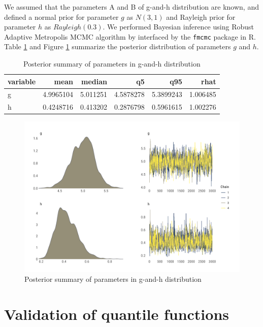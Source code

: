 \documentclass[
  12pt,
]{article}
\begin{document}
We assumed that the parameters A and B of g-and-h distribution are known, and defined a normal prior for parameter \(g\) as \(N(3,1)\) and Rayleigh prior for parameter \(h\) as \(Rayleigh(0.3)\). We performed Bayesian inference using Robust Adaptive Metropolis MCMC algorithm by \citet{vihola2012RobustAdaptiveMetropolis} interfaced by the \texttt{fmcmc} package \citep{vegayon2019FmcmcFriendlyMCMC} in R. Table \ref{tab:gnh-fit-tbl} and Figure \ref{fig:gnh-combo-graph} summarize the posterior distribution of parameters \(g\) and \(h\).

\begin{table}[!h]

\caption{\label{tab:gnh-fit-tbl}Posterior summary of parameters in g-and-h distribution}
\centering
\begin{tabular}[t]{lrrrrr}
\toprule
variable & mean & median & q5 & q95 & rhat\\
\midrule
g & 4.9965104 & 5.011251 & 4.5878278 & 5.3899243 & 1.006485\\
h & 0.4248716 & 0.413202 & 0.2876798 & 0.5961615 & 1.002276\\
\bottomrule
\end{tabular}
\end{table}

\begin{figure}

{\centering \includegraphics[width=0.8\linewidth]{ilbm_article_files/figure-latex/gnh-combo-graph-1} 

}

\caption{Posterior summary of parameters in g-and-h distribution}\label{fig:gnh-combo-graph}
\end{figure}

\hypertarget{validation-of-quantile-functions}{%
\section{Validation of quantile functions}\label{validation-of-quantile-functions}}
\end{document}

